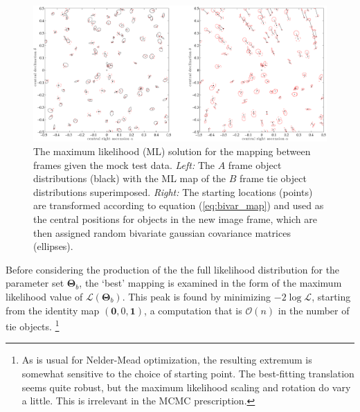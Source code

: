 \documentclass[manuscript]{aastex}
\newcommand{\bsT}{\boldsymbol\Theta}
\begin{document}
\begin{figure}[h]
\centering
\includegraphics[width=\linewidth]{figures/test_solution.pdf}
\caption{The maximum likelihood (ML) solution for the mapping between frames given the mock test data. \emph{Left:} The $A$ frame object distributions (black) with the ML map of the $B$ frame tie object distributions superimposed. \emph{Right:} The starting locations (points) are transformed according to equation (\ref{eq:bivar_map}) and used as the central positions for objects in the new image frame, which are then assigned random bivariate gaussian covariance matrices (ellipses). }\label{fig:test_solution}
\end{figure}
Before considering the production of the the full likelihood distribution for the parameter set $\bsT_b$, the `best' mapping is examined in the form of the maximum likelihood value of $\mathcal{L}(\bsT_b)$. This peak is found by minimizing  $-2\log\mathcal{L}$, starting from the identity map $(\mathbf{0},0,\mathbf{1})$, a  computation that is $\mathcal{O}(n)$ in the number of tie objects.
\footnote{As is usual for Nelder-Mead optimization, the resulting extremum is somewhat sensitive to the choice of starting point. The best-fitting translation seems quite robust, but the maximum likelihood scaling and rotation do vary a little. This is irrelevant in the MCMC prescription.}
\end{document}

